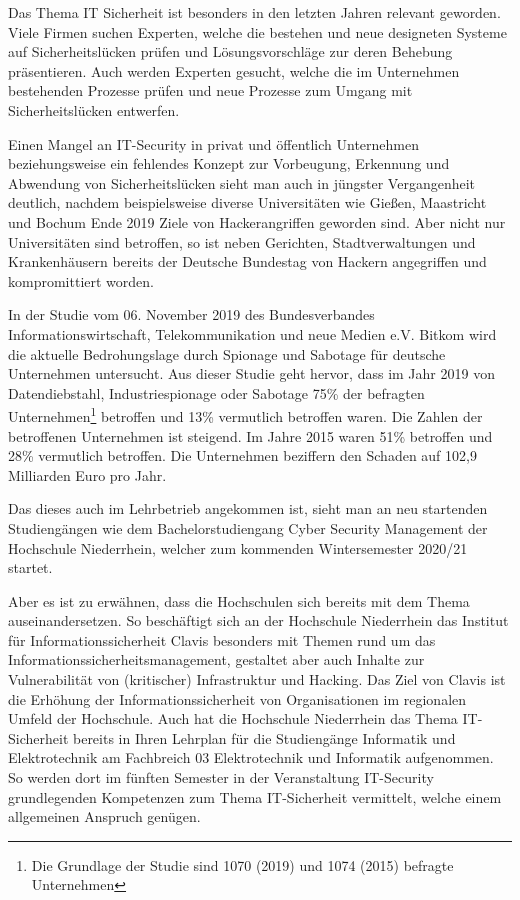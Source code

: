 \label{chap_text:Einleitung}
Das Thema IT Sicherheit ist besonders in den letzten Jahren relevant geworden. Viele Firmen suchen Experten\cite{it-daily.netITSecurityExpertenWerdenHanderingend2019}, welche die bestehen und neue designeten Systeme auf Sicherheitslücken prüfen und Lösungsvorschläge zur deren Behebung präsentieren. Auch werden Experten gesucht, welche die im Unternehmen bestehenden Prozesse prüfen und neue Prozesse zum Umgang mit Sicherheitslücken entwerfen.

Einen Mangel an IT-Security in privat und öffentlich Unternehmen beziehungsweise ein fehlendes Konzept zur Vorbeugung, Erkennung und Abwendung von Sicherheitslücken sieht man auch in jüngster Vergangenheit deutlich, nachdem beispielsweise diverse Universitäten wie Gießen, Maastricht und Bochum Ende 2019 Ziele von Hackerangriffen geworden sind. Aber nicht nur Universitäten sind betroffen, so ist neben Gerichten, Stadtverwaltungen und Krankenhäusern bereits der Deutsche Bundestag von Hackern angegriffen und kompromittiert worden.

In der Studie  vom 06. November 2019 des Bundesverbandes Informationswirtschaft, Telekommunikation und neue Medien e.V. Bitkom wird die aktuelle Bedrohungslage durch Spionage und Sabotage für deutsche Unternehmen untersucht. Aus dieser Studie geht hervor, dass im Jahr 2019 von Datendiebstahl, Industriespionage oder Sabotage 75\% der befragten Unternehmen\footnote{Die Grundlage der Studie sind 1070 (2019) und 1074 (2015) befragte Unternehmen} betroffen  und 13\% vermutlich betroffen waren. Die Zahlen der betroffenen Unternehmen ist steigend. Im Jahre 2015 waren  51\% betroffen und 28\% vermutlich betroffen. Die Unternehmen beziffern den Schaden auf 102,9 Milliarden Euro pro Jahr.\cite{bergWirtschaftsschutzDigitalenWelt2019}

Das dieses auch im Lehrbetrieb angekommen ist, sieht man an neu startenden Studiengängen wie dem Bachelorstudiengang Cyber Security Management der Hochschule Niederrhein, welcher zum kommenden Wintersemester 2020/21 startet.\cite{hochschuleniederrheinHackernRoteKarte2020}

Aber es ist zu erwähnen, dass die Hochschulen sich bereits mit dem Thema auseinandersetzen. 
So beschäftigt sich an der Hochschule Niederrhein das Institut für Informationssicherheit Clavis besonders mit Themen rund um das Informationssicherheitsmanagement, gestaltet aber auch Inhalte zur Vulnerabilität von (kritischer) Infrastruktur und Hacking.
Das Ziel von Clavis ist die Erhöhung der Informationssicherheit von Organisationen im regionalen Umfeld der Hochschule.
\cite{hochschuleniederrheinFlyerInstitutClavis}
Auch hat die Hochschule Niederrhein das Thema IT-Sicherheit bereits in Ihren Lehrplan für die Studiengänge Informatik und Elektrotechnik am Fachbreich 03 Elektrotechnik und Informatik aufgenommen. So werden dort im fünften Semester in der Veranstaltung IT-Security grundlegenden Kompetenzen zum Thema IT-Sicherheit vermittelt, welche einem allgemeinen Anspruch genügen.\cite{hochschuleniederrheinModulhandbuchVollzeitBA2019}